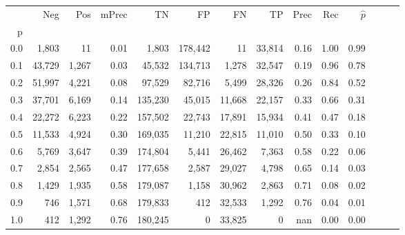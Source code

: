 \begin{tabular}{rrrrrrrrrrrrrr}
\toprule
{} &     Neg &    Pos & mPrec &       TN &       FP &      FN &      TP &  Prec &   Rec & $\hat{p}$ \\
p   &         &        &       &          &          &         &         &       &       &           \\
\midrule
0.0 &   1,803 &     11 &  0.01 &    1,803 &  178,442 &      11 &  33,814 &  0.16 &  1.00 &      0.99 \\
0.1 &  43,729 &  1,267 &  0.03 &   45,532 &  134,713 &   1,278 &  32,547 &  0.19 &  0.96 &      0.78 \\
0.2 &  51,997 &  4,221 &  0.08 &   97,529 &   82,716 &   5,499 &  28,326 &  0.26 &  0.84 &      0.52 \\
0.3 &  37,701 &  6,169 &  0.14 &  135,230 &   45,015 &  11,668 &  22,157 &  0.33 &  0.66 &      0.31 \\
0.4 &  22,272 &  6,223 &  0.22 &  157,502 &   22,743 &  17,891 &  15,934 &  0.41 &  0.47 &      0.18 \\
0.5 &  11,533 &  4,924 &  0.30 &  169,035 &   11,210 &  22,815 &  11,010 &  0.50 &  0.33 &      0.10 \\
0.6 &   5,769 &  3,647 &  0.39 &  174,804 &    5,441 &  26,462 &   7,363 &  0.58 &  0.22 &      0.06 \\
0.7 &   2,854 &  2,565 &  0.47 &  177,658 &    2,587 &  29,027 &   4,798 &  0.65 &  0.14 &      0.03 \\
0.8 &   1,429 &  1,935 &  0.58 &  179,087 &    1,158 &  30,962 &   2,863 &  0.71 &  0.08 &      0.02 \\
0.9 &     746 &  1,571 &  0.68 &  179,833 &      412 &  32,533 &   1,292 &  0.76 &  0.04 &      0.01 \\
1.0 &     412 &  1,292 &  0.76 &  180,245 &        0 &  33,825 &       0 &   nan &  0.00 &      0.00 \\
\bottomrule
\end{tabular}
